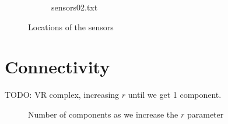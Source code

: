 \documentclass[a4paper, 12pt]{article}
\begin{document}
\begin{figure}[H]
{\begin{subfigure}[b]{0.55\textwidth}
                \caption{sensors02.txt}
            \end{subfigure}
        }
        \caption{Locations of the sensors}
\end{figure}

\section{Connectivity}
TODO: VR complex, increasing $r$ until we get 1 component. 

\begin{figure}[H]
        \centering
        \caption{Number of components as we increase the $r$ parameter}
\end{figure}
\end{document}
